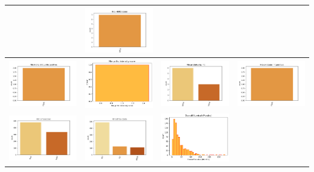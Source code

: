 \begin{center}
\begin{tabular}{ |c|c|c|c| }
		& \includegraphics[width=.25\textwidth]{NOTEBOOK/IMAGENES_CRUDAS/72} 
		\\  \hline 
		\includegraphics[width=.25\textwidth]{NOTEBOOK/IMAGENES_CRUDAS/73} 
		& \includegraphics[width=.25\textwidth]{NOTEBOOK/IMAGENES_CRUDAS/74} 
		& \includegraphics[width=.25\textwidth]{NOTEBOOK/IMAGENES_CRUDAS/75} 
		& \includegraphics[width=.25\textwidth]{NOTEBOOK/IMAGENES_CRUDAS/76} 
		\\  \hline 
		\includegraphics[width=.25\textwidth]{NOTEBOOK/IMAGENES_CRUDAS/77} 
		& \includegraphics[width=.25\textwidth]{NOTEBOOK/IMAGENES_CRUDAS/78} 
		& \includegraphics[width=.25\textwidth]{NOTEBOOK/IMAGENES_CRUDAS/79} 

\end{tabular}
\end{center}
